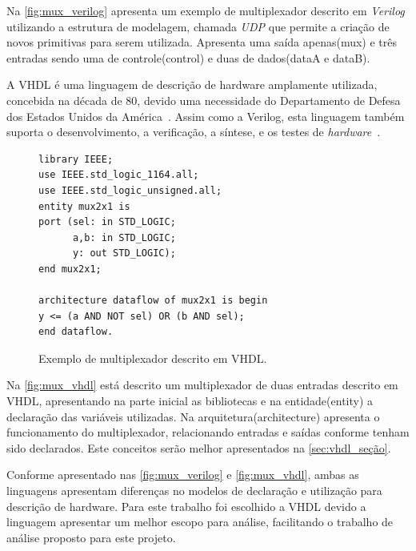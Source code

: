 \par
Na \autoref{fig:mux_verilog} apresenta um exemplo de multiplexador descrito em \textit{Verilog} utilizando a estrutura de modelagem, chamada \textit{UDP} que permite a criação de novos primitivas para serem utilizada. Apresenta uma saída apenas(mux) e três entradas sendo uma de controle(control) e duas de dados(dataA e dataB).

\par
A VHDL é uma linguagem de descrição de hardware amplamente utilizada, concebida na década de 80, devido uma necessidade do Departamento de Defesa dos Estados Unidos da América~\cite{cappelattipraticando}. Assim como a Verilog, esta linguagem também suporta o desenvolvimento, a verificação, a síntese, e os testes de \textit{hardware}~\cite{IEEEVHDLLanguage}.

\begin{figure}[H]
\caption{\label{fig:mux_vhdl} Exemplo de multiplexador descrito em VHDL.}
	\begin{center}
    \begin{minipage}{0.6\textwidth}
    \begin{lstlisting}       
library IEEE;
use IEEE.std_logic_1164.all;
use IEEE.std_logic_unsigned.all;
entity mux2x1 is
port (sel: in STD_LOGIC;
      a,b: in STD_LOGIC;
      y: out STD_LOGIC);
end mux2x1;

architecture dataflow of mux2x1 is begin
y <= (a AND NOT sel) OR (b AND sel);
end dataflow.
\end{lstlisting}
    \end{minipage}
	\end{center}
\end{figure}

\par
Na \autoref{fig:mux_vhdl} está descrito um multiplexador de duas entradas descrito em VHDL, apresentando na parte inicial as bibliotecas e na entidade(entity) a declaração das variáveis utilizadas. Na arquitetura(architecture) apresenta o funcionamento do multiplexador, relacionando entradas e saídas conforme tenham sido declarados. Este conceitos serão melhor apresentados na \autoref{sec:vhdl_seção}.

\par
Conforme apresentado nas \autoref{fig:mux_verilog} e \autoref{fig:mux_vhdl}, ambas as linguagens apresentam diferenças no modelos de declaração e utilização para descrição de hardware. Para este trabalho foi escolhido a VHDL devido a linguagem apresentar um melhor escopo para análise, facilitando o trabalho de análise proposto para este projeto.


